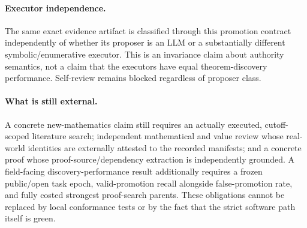 \paragraph{Executor independence.}
The same exact evidence artifact is classified through this promotion contract independently of whether its proposer is an LLM or a substantially different symbolic/enumerative executor.  This is an invariance claim about authority semantics, not a claim that the executors have equal theorem-discovery performance.  Self-review remains blocked regardless of proposer class.

\paragraph{What is still external.}
A concrete new-mathematics claim still requires an actually executed, cutoff-scoped literature search; independent mathematical and value review whose real-world identities are externally attested to the recorded manifests; and a concrete proof whose proof-source/dependency extraction is independently grounded.  A field-facing discovery-performance result additionally requires a frozen public/open task epoch, valid-promotion recall alongside false-promotion rate, and fully costed strongest proof-search parents.  These obligations cannot be replaced by local conformance tests or by the fact that the strict software path itself is green.
